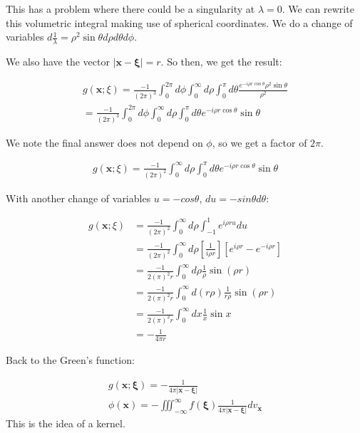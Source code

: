 \documentclass{article}
\theoremstyle{definition}
\begin{document}
This has a problem where there could be a singularity at $\lambda = 0$. We can rewrite this volumetric integral making use of spherical coordinates. We do a change of variables $d \frac{1}{\lambda} = \rho^2 \sin \theta d\rho d\theta d\phi $.

We also have the vector $|\mathbf{x - \xi }| = r$. So then, we get the result:

\begin{align*}
g(\mathbf{x};\xi) = \frac{-1}{(2 \pi)^{3}} \int_{0}^{2\pi} d\phi \int_0^\infty d\rho \int_0^\pi d\theta \frac{e^{-i \rho r \cos \theta }\rho^2 \sin \theta }{\rho^2} \\
= \frac{-1}{(2 \pi)^{3}} \int_{0}^{2\pi} d\phi \int_0^\infty d\rho \int_0^\pi d\theta e^{-i \rho r \cos \theta } \sin \theta 
\end{align*}

We note the final answer does not depend on $\phi$, so we get a factor of $2\pi$.

\begin{align*}
g(\mathbf{x};\xi) = \frac{-1}{(2 \pi)^{2}}  \int_0^\infty d\rho \int_0^\pi d\theta e^{-i \rho r \cos \theta } \sin \theta 
\end{align*}

With another change of variables $u = -cos\theta$, $du = -sin\theta d\theta$:

\begin{align*}
g(\mathbf{x};\xi)&= \frac{-1}{(2 \pi)^{2}}  \int_0^\infty d\rho \int_{-1}^1  e^{i \rho r u} du \\ 
&= \frac{-1}{(2 \pi)^{2}}  \int_0^\infty d\rho \left[\frac{1}{i\rho r}\right] \left[e^{i \rho r} - e^{-i \rho r}\right]\\
&= \frac{-1}{2 (\pi)^{2} r}  \int_0^\infty d\rho \frac{1}{\rho}\sin (\rho r)\\
&= \frac{-1}{2 (\pi)^{2} r}  \int_0^\infty d(r\rho) \frac{1}{r\rho}\sin (\rho r) \\
&= \frac{-1}{2 (\pi)^{2} r}  \int_0^\infty dx \frac{1}{x}\sin x \\
& = - \frac{1}{4 \pi r}
\end{align*}

Back to the Green's function:

\begin{align*}
g(\mathbf{x};\mathbf{\xi}) = - \frac{1}{4 \pi |\mathbf{x}-\mathbf{\xi}|} \\
\phi(\mathbf{x}) = -\iiint_{-\infty}^\infty f(\mathbf{\xi}) \frac{1}{4 \pi |\mathbf{x}-\mathbf{\xi}|} dv_\mathbf{x}
\end{align*}
This is the idea of a kernel.
\end{document}
